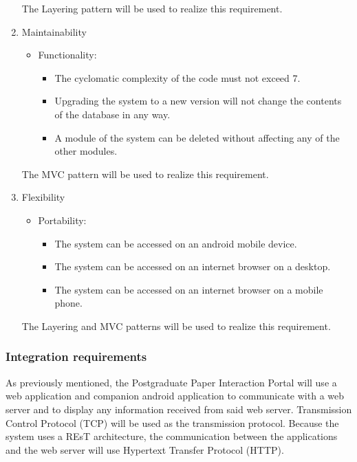 \documentclass{article}
\begin{document}
\begin{enumerate}
		The Layering pattern will be used to realize this requirement.
		
		\item{Maintainability}
		\begin{itemize}
			\item Functionality:
			\begin{itemize}
				\item The cyclomatic complexity of the code must not exceed 7.
				\item Upgrading the system to a new version will not change the contents of the database in any way.
				\item A module of the system can be deleted without affecting any of the other modules.
			\end{itemize}
		\end{itemize}
		
		The MVC pattern will be used to realize this requirement.

		\item{Flexibility}
		\begin{itemize}
			\item Portability:
			\begin{itemize}
				\item The system can be accessed on an android mobile device.
				\item The system can be accessed on an internet browser on a desktop.
				\item The system can be accessed on an internet browser on a mobile phone.
			\end{itemize}
		\end{itemize}
		
		The Layering and MVC patterns will be used to realize this requirement.
		
	\end{enumerate}

	\subsubsection{Integration requirements}

	As previously mentioned, the Postgraduate Paper Interaction Portal will use a web application and companion android application to communicate with a web server and to 
	display any information received from said web server. Transmission Control Protocol (TCP) will be used as the transmission protocol. 
	Because the system uses a REsT architecture, the communication between the applications and the web server will use Hypertext Transfer Protocol (HTTP).\\
	
\end{document}
